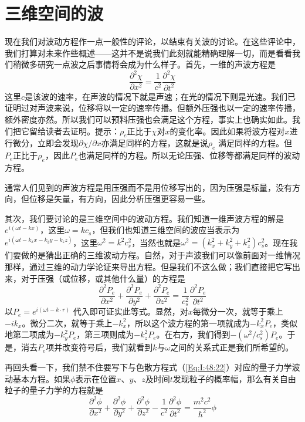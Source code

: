 \section{三维空间的波}

现在我们对波动方程作一点一般性的评论，以结束有关波的讨论。在这些评论中，我们打算对未来作些概述——这并不是说我们此刻就能精确理解一切，而是看看我们稍微多研究一点波之后事情将会成为什么样子。首先，一维的声波方程是
\begin{equation*}
    \frac{\partial^2\chi}{\partial x^2} = \frac{1}{c^2} \frac{\partial^2 \chi}{\partial t^2}
\end{equation*}
这里$c$是该波的速率，在声波的情况下就是声速；在光的情况下则是光速。我们已证明过对声波来说，位移将以一定的速率传播。但额外压强也以一定的速率传播，额外密度亦然。所以我们可以预料压强也会满足这个方程，事实上也确实如此。我们把它留给读者去证明。提示：$\rho_e$正比于$\chi$对$x$的变化率。因此如果将波方程对$x$进行微分，立即会发现$\partial \chi /\partial x$亦满足同样的方程，这就是说$\rho_e$ 满足同样的方程。但$P_e$正比于$\rho_e$，因此$P_e$也满足同样的方程。所以无论压强、位移等都满足同样的波动方程。

通常人们见到的声波方程是用压强而不是用位移写出的，因为压强是标量，没有方向，但位移是矢量，有方向，因此分析压强更容易一些。

其次，我们要讨论的是三维空间中的波动方程。我们知道一维声波方程的解是$e^{i(\omega t - kx )}$，这里$\omega =kc_s$，但我们也知道三维空间的波应当表示为$e^{i(\omega t - k_x x - k_y y - k_z z)}$，这里$\omega^2 = k^2c_s^2$，当然也就是$\omega^2 = (k_x^2 + k_y^2 + k_z^2)c_s^2$。现在我们要做的是猜出正确的三维波动方程。自然，对于声波我们可以像前面对一维情况那样，通过三维的动力学论证来导出方程。但是我们不这么做；我们直接把它写出来，对于压强（或位移，或其他什么量）的方程是
\begin{equation}
    \label{Eq:I:48:23}
    \frac{\partial^2 P_e}{\partial x^2} + \frac{\partial^2 P_e}{\partial y^2} + \frac{\partial^2 P_e}{\partial z^2} = \frac{1}{c_s^2}\frac{\partial^2 P_e}{\partial t^2}
\end{equation}
以$P_e =e^{i(\omega t - k\cdot r)}$ 代入即可证实此等式。显然，对$x$每微分一次，就等于乘上$-ik_x$。微分二次，就等于乘上$-k_x^2$，所以这个波方程的第一项就成为$-k_x^2P_e$，类似地第二项成为$-k_y^2P_e$，第三项则成为$-k_z^2P_e$。在右方，我们得到$-(\omega^2/c_s^2)P_e$。于是，消去$P_e$项并改变符号后，我们就看到$k$与$\omega$之间的关系式正是我们所希望的。

再回头看一下，我们禁不住要写下与色散方程式（\ref{Eq:I:48:22}）对应的量子力学波动基本方程。如果$\phi$表示在位置$x$、$y$、$z$及时间$t$发现粒子的概率幅，那么有关自由粒子的量子力学的方程就是
\begin{equation}
    \label{Eq:I:48:24}
    \frac{\partial^2 \phi}{\partial x^2} + \frac{\partial^2 \phi}{\partial y^2} + \frac{\partial^2 \phi}{\partial z^2} - \frac{1}{c^2}\frac{\partial^2 \phi}{\partial t^2} = \frac{m^2c^2}{\hbar^2}\phi
\end{equation}

